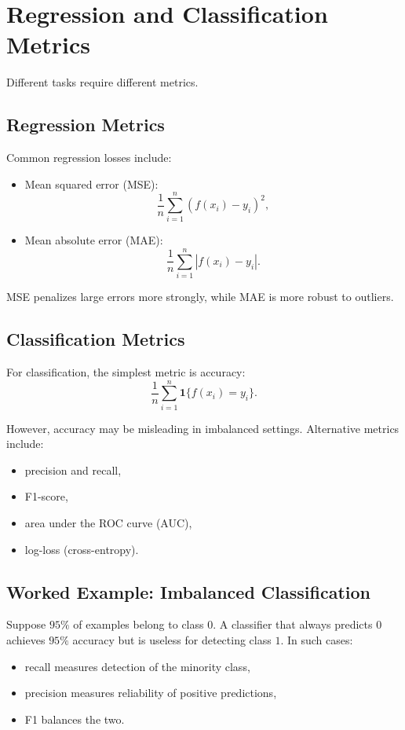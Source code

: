 \section{Regression and Classification Metrics}

Different tasks require different metrics.

\subsection{Regression Metrics}

Common regression losses include:
\begin{itemize}
    \item Mean squared error (MSE):
    \[
    \frac1n\sum_{i=1}^n (f(x_i)-y_i)^2,
    \]
    \item Mean absolute error (MAE):
    \[
    \frac1n\sum_{i=1}^n |f(x_i)-y_i|.
    \]
\end{itemize}

MSE penalizes large errors more strongly, while MAE is more robust to outliers.

\subsection{Classification Metrics}

For classification, the simplest metric is accuracy:
\[
\frac{1}{n}\sum_{i=1}^n \mathbf{1}\{f(x_i)=y_i\}.
\]

However, accuracy may be misleading in imbalanced settings. Alternative metrics include:
\begin{itemize}
    \item precision and recall,
    \item F1-score,
    \item area under the ROC curve (AUC),
    \item log-loss (cross-entropy).
\end{itemize}

\subsection{Worked Example: Imbalanced Classification}

Suppose $95\%$ of examples belong to class $0$. A classifier that always predicts $0$ achieves $95\%$ accuracy but is useless for detecting class $1$. In such cases:
\begin{itemize}
    \item recall measures detection of the minority class,
    \item precision measures reliability of positive predictions,
    \item F1 balances the two.
\end{itemize}

